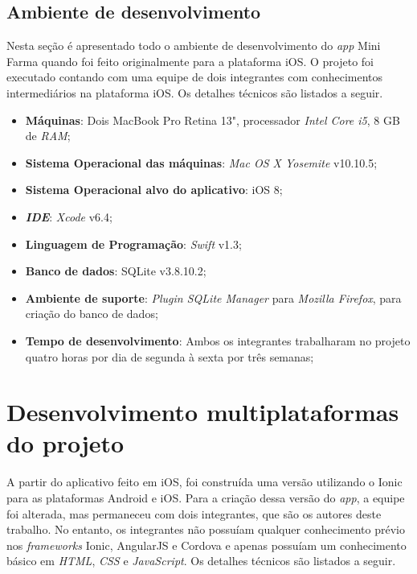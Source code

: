 \subsection{Ambiente de desenvolvimento} \label{subsec:ambientedesenvolvimento}
Nesta seção é apresentado todo o ambiente de desenvolvimento do \textit{app} Mini Farma quando foi feito originalmente para a plataforma iOS. 
O projeto foi executado contando com uma equipe de dois integrantes com conhecimentos intermediários na plataforma iOS. 
Os detalhes técnicos são listados a seguir.
\begin{itemize}
    \item \textbf{Máquinas}: Dois MacBook Pro Retina 13", processador \textit{Intel Core i5}, 8 GB de \textit{RAM};
    \item \textbf{Sistema Operacional das máquinas}: \textit{Mac OS X Yosemite} v10.10.5;
    \item \textbf{Sistema Operacional alvo do aplicativo}: iOS 8;
    \item \textbf{\textit{IDE}}: \textit{Xcode} v6.4;
    \item \textbf{Linguagem de Programação}: \textit{Swift} v1.3;
    \item \textbf{Banco de dados}: SQLite v3.8.10.2;
    \item \textbf{Ambiente de suporte}: \textit{Plugin SQLite Manager} para \textit{Mozilla Firefox}, para criação do banco de dados;
    \item \textbf{Tempo de desenvolvimento}: Ambos os integrantes trabalharam no projeto quatro horas por dia de segunda à sexta por três semanas;
\end{itemize}

\section{Desenvolvimento multiplataformas do projeto} \label{sec:desenvolvimentomulti}

A partir do aplicativo feito em iOS, foi construída uma versão utilizando o Ionic para as plataformas Android e iOS.
Para a criação dessa versão do \textit{app}, a equipe foi alterada, mas permaneceu com dois integrantes, que são os autores deste trabalho.
No entanto, os integrantes não possuíam qualquer conhecimento prévio nos \textit{frameworks} Ionic, AngularJS e Cordova
e apenas possuíam um conhecimento básico em \textit{HTML}, \textit{CSS} e \textit{JavaScript}. Os detalhes técnicos são listados a seguir.
   
